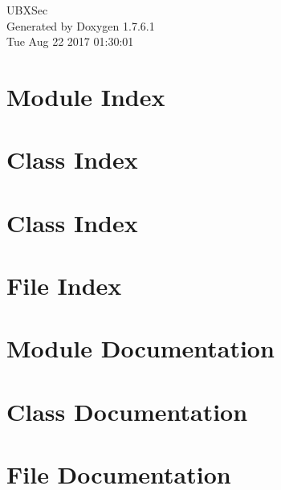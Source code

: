 \documentclass[a4paper]{book}
\begin{document}
\hypersetup{pageanchor=false,citecolor=blue}
\begin{titlepage}
\vspace*{7cm}
\begin{center}
{\Large \-U\-B\-X\-Sec }\\
\vspace*{1cm}
{\large \-Generated by Doxygen 1.7.6.1}\\
\vspace*{0.5cm}
{\small Tue Aug 22 2017 01:30:01}\\
\end{center}
\end{titlepage}
\clearemptydoublepage
{}
\tableofcontents
\clearemptydoublepage
{}
\hypersetup{pageanchor=true,citecolor=blue}
\chapter{\-Module \-Index}

\chapter{\-Class \-Index}

\chapter{\-Class \-Index}

\chapter{\-File \-Index}

\chapter{\-Module \-Documentation}

\chapter{\-Class \-Documentation}

























\chapter{\-File \-Documentation}




\printindex
\end{document}
